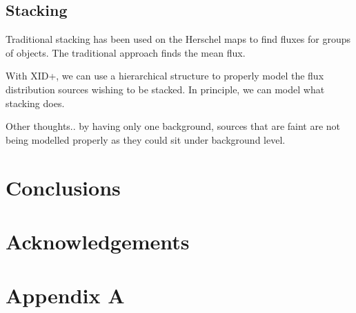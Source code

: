 \documentclass[useAMS,usenatbib]{mn2e}
\begin{document}
\subsection{Stacking}
Traditional stacking has been used on the Herschel maps to find fluxes for groups of objects. The traditional approach finds the mean flux.

With XID+, we can use a hierarchical structure to properly model the flux distribution sources wishing to be stacked. In principle, we can model what stacking does. 

Other thoughts.. by having only one background, sources that are faint are not being modelled properly as they could sit under background level.
\section{Conclusions}



\section*{Acknowledgements} %
%
%
%

\appendix
\section*{Appendix A}\label{Stan_model}
\onecolumn

%
%
%
%
%
%
%
\end{document}

